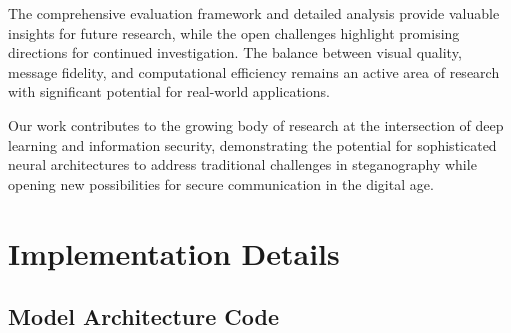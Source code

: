 \documentclass[12pt,a4paper]{report}
\begin{document}
The comprehensive evaluation framework and detailed analysis provide valuable insights for future research, while the open challenges highlight promising directions for continued investigation. The balance between visual quality, message fidelity, and computational efficiency remains an active area of research with significant potential for real-world applications.

Our work contributes to the growing body of research at the intersection of deep learning and information security, demonstrating the potential for sophisticated neural architectures to address traditional challenges in steganography while opening new possibilities for secure communication in the digital age.




\appendix

\chapter{Implementation Details}
\label{app:implementation}

\section{Model Architecture Code}
\end{document}
